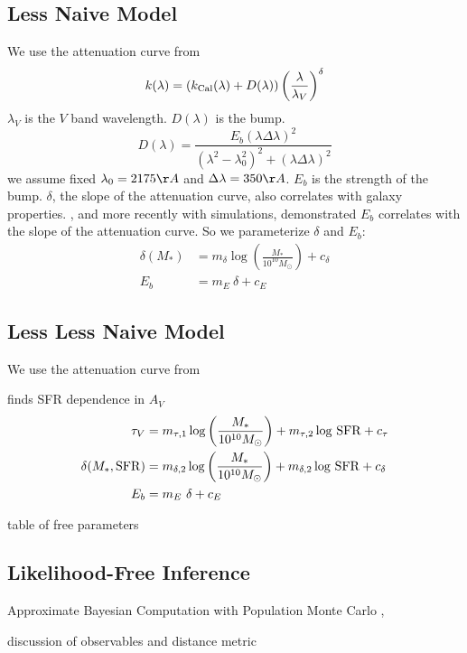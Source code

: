 \subsection{Less Naive Model} 
We use the attenuation curve from \cite{noll2009} 
\begin{equation}
    k(\lambda) = \left(k_{\rm Cal}(\lambda) + D(\lambda)\right) \left(
    \frac{\lambda}{\lambda_V} \right)^\delta
\end{equation}
$\lambda_V$ is the $V$ band wavelength. $D(\lambda)$ is the bump. 
\begin{equation}
    D(\lambda) = \frac{E_b(\lambda \Delta \lambda)^2}{(\lambda^2 -
    \lambda_0^2)^2 + (\lambda \Delta \lambda)^2}
\end{equation}
we assume fixed $\lambda_0 = 2175 \AA$ and $\Delta \lambda = 350\AA$. $E_b$ is
the strength of the bump.
$\delta$, the slope of the attenuation curve, also correlates with galaxy
properties.
\cite{kriek2013}, and \cite{naranyanan2018} more recently with simulations, 
demonstrated $E_b$ correlates with the slope of the attenuation curve.
So we parameterize $\delta$ and $E_b$: 
\begin{align}
    \delta(M_*) &= m_\delta \log \left(\frac{M_*}{10^{10}
    M_\odot}\right) + c_\delta \\
    E_b &= m_E~\delta + c_E
\end{align}

\subsection{Less Less Naive Model} 
We use the attenuation curve from \cite{noll2009} 

\cite{salim2020} finds SFR dependence in $A_V$
\begin{align}
    \tau_V &= m_{\tau,1} \log \left(\frac{M_*}{10^{10} M_\odot}\right) +
    m_{\tau,2} \log\,{\rm SFR} + c_\tau \\ 
    \delta(M_*, {\rm SFR}) &= m_{\delta,2} \log \left(\frac{M_*}{10^{10}
    M_\odot}\right) + m_{\delta,2} \log\,{\rm SFR} + c_\delta \\
    E_b &= m_E~\delta + c_E
\end{align}


\begin{table}
    table of free parameters 
\end{table} 


\subsection{Likelihood-Free Inference} 
Approximate Bayesian Computation with Population Monte Carlo \cite{hahn2017a},

discussion of observables and distance metric 
\cite{ishida2015} 

